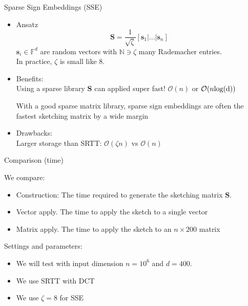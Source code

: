 \documentclass{beamer}
\newcommand{\bvec}[1]{\mathbf{#1}}
\newcommand{\vs}{\bvec{s}}
\newcommand{\vS}{\bvec{S}}
\newcommand{\bitem}{\item[$\bullet$]}
\begin{document}
\begin{frame}{Sparse Sign Embeddings (SSE)}

\begin{itemize}
    \bitem Ansatz
    $$
    \vS = \frac{1}{\sqrt{\zeta}} [\vs_1|...|\vs_n]
    $$
    $\vs_i\in\mathbb{F}^d$ are random vectors with $\mathbb{N} \ni \zeta$ many Rademacher entries.\\
    In practice, $\zeta$ is small like $8$.
    \bitem Benefits:\\
    Using a sparse library $\vS$ can applied super fast! $ \mathcal{O}(n)$ or $\mathcal{O}(n {\rm log(d)})$\\
    \begin{center}
        With a good sparse matrix library, sparse sign embeddings are often the fastest sketching matrix by a wide margin
    \end{center}
    \bitem Drawbacks:\\
    Larger storage than SRTT: $\mathcal{O}(\zeta n)$ vs $\mathcal{O}(n)$
\end{itemize}
\end{frame}


\begin{frame}{Comparison (time)}

We compare:
\begin{itemize}
    \bitem Construction: The time required to generate the sketching matrix $\vS$.
    \bitem Vector apply. The time to apply the sketch to a single vector
    \bitem Matrix apply. The time to apply the sketch to an $n\times 200$ matrix
\end{itemize}

Settings and parameters:
\begin{itemize}
    \bitem We will test with input dimension $n = 10^6$ and $d = 400$.
    \bitem We use SRTT with DCT
    \bitem We use $\zeta = 8$ for SSE
\end{itemize}
    
\end{frame}
\end{document}
